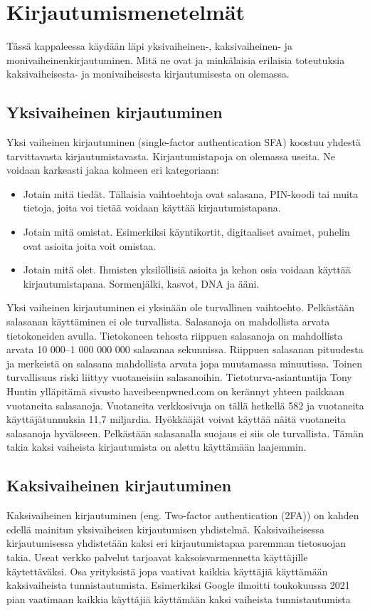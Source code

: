 \chapter{Kirjautumismenetelmät\label{kirjautumismenetelmät}}

Tässä kappaleessa käydään läpi yksivaiheinen-, kaksivaiheinen- ja monivaiheinenkirjautuminen. Mitä ne ovat ja minkälaisia erilaisia toteutuksia kaksivaiheisesta- ja monivaiheisesta kirjautumisesta on olemassa.

\section{Yksivaiheinen kirjautuminen}

Yksi vaiheinen kirjautuminen (single-factor authentication SFA) koostuu yhdestä tarvittavasta kirjautumistavasta. Kirjautumistapoja on olemassa useita. Ne voidaan karkeasti jakaa kolmeen eri kategoriaan: 

\begin{itemize}
    \item Jotain mitä tiedät. Tällaisia vaihtoehtoja ovat salasana, PIN-koodi tai muita tietoja, joita voi tietää voidaan käyttää kirjautumistapana.
    \item Jotain mitä omistat. Esimerkiksi käyntikortit, digitaaliset avaimet, puhelin ovat asioita joita voit omistaa.
    \item Jotain mitä olet. Ihmisten yksilöllisiä asioita ja kehon osia voidaan käyttää kirjautumistapana. Sormenjälki, kasvot, DNA ja ääni.
\end{itemize}
Yksi vaiheinen kirjautuminen ei yksinään ole turvallinen vaihtoehto. Pelkästään salasanan käyttäminen ei ole turvallista. Salasanoja on mahdollista arvata tietokoneiden avulla. Tietokoneen tehosta riippuen salasanoja on mahdollista arvata 10 000–1 000 000 000 salasanaa sekunnissa. Riippuen salasanan pituudesta ja merkeistä on salasana mahdollista arvata jopa muutamassa minuutissa. \citep{brute_force_attack} Toinen turvallisuus riski liittyy vuotaneisiin salasanoihin. Tietoturva-asiantuntija Tony Huntin ylläpitämä sivusto haveibeenpwned.com on kerännyt yhteen paikkaan vuotaneita salasanoja. Vuotaneita verkkosivuja on tällä hetkellä 582 ja vuotaneita käyttäjätunnuksia 11,7 miljardia. \citep{Have_i_been_pwned} Hyökkääjät voivat käyttää näitä vuotaneita salasanoja hyväkseen. Pelkästään salasanalla suojaus ei siis ole turvallista. Tämän takia kaksi vaiheista kirjautumista on alettu käyttämään laajemmin. 

\section{Kaksivaiheinen kirjautuminen}
Kaksivaiheinen kirjautuminen (eng. Two-factor authentication (2FA)) on kahden edellä mainitun yksivaiheisen kirjautumisen yhdistelmä. Kaksivaiheisessa kirjautumisessa yhdistetään kaksi eri kirjautumistapaa paremman tietosuojan takia. 
Useat verkko palvelut tarjoavat kaksoisvarmennetta käyttäjille käytettäväksi. Osa yrityksistä jopa vaativat kaikkia käyttäjiä käyttämään kaksivaiheista tunnistautumista. Esimerkiksi Google ilmoitti toukokuussa 2021 pian vaatimaan kaikkia käyttäjiä käyttämään kaksi vaiheista tunnistautumista \citep{future_without_passwords}

